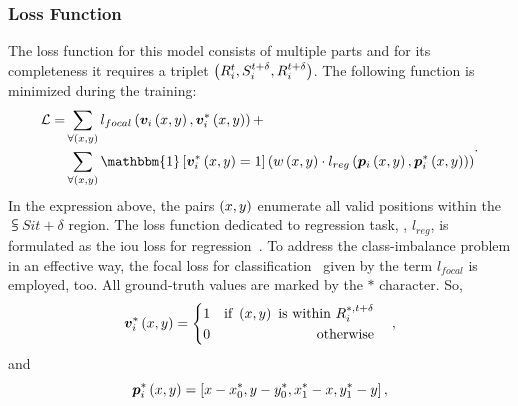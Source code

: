 \subsubsection{Loss Function}

The loss function for this model consists of multiple parts and for its completeness it requires a triplet $\left( {{R}_{i}^{t}, {S}_{i}^{t + \delta}, {R}_{i}^{t + \delta}} \right)$. The following function is minimized during the training:
\begin{equation}
    \begin{aligned}
        \lossf =
         & \sum_{\forall \rbrackets{x, y}}
        \func{l_{focal}}{
            \func{\mtxsub{v}{i}}{
                x, y
            },
            \func{\mtxsubsup{v}{i}{*}}{
                x, y
            }
        } +                                \\
         & \sum_{\forall \rbrackets{x, y}}
        \mathbbm{1}
        \sbrackets{
            \func{\mtxsubsup{v}{i}{*}}{
                x, y
            } = 1
        }
        \rbrackets{
            \func{w}{x, y}
            \cdot
            \func{l_{reg}}{
                \func{\mtxsub{p}{i}}{x, y},
                \func{\mtxsubsup{p}{i}{*}}{x, y}
            }
        }
    \end{aligned}.
\end{equation}
In the expression above, the pairs $\left( {x, y} \right)$ enumerate all valid positions within the $\subsup{S}{i}{t + \delta}$ region. The loss function dedicated to regression task, \ietext{}, $l_{reg}$, is formulated as the \gls{iou} loss for regression~\cite{danelljan2019atom, yu2016unitbox}. To address the class-imbalance problem in an effective way, the focal loss for classification~\cite{lin2018focal} given by the term $l_{focal}$ is employed, too. All ground-truth values are marked by the $*$ character. So,
\begin{equation}
    {\bm{v}_{i}^{*}} \left( x, y \right) =
    \begin{cases}
        \begin{aligned}
             & 1 & \text{if } \left( {x, y} \right) \text{ is within } {R}_{i}^{*, t + \delta} \\
             & 0 & \text{otherwise}                                                            \\
        \end{aligned}
    \end{cases},
\end{equation}
and
\begin{equation}
    {\bm{p}_{i}^{*}} \left( x, y \right) =
    \left[ {
        x - {x}_{0}^{*},
        y - {y}_{0}^{*},
        {x}_{1}^{*} - x,
        {y}_{1}^{*} - y
    } \right],
\end{equation}
